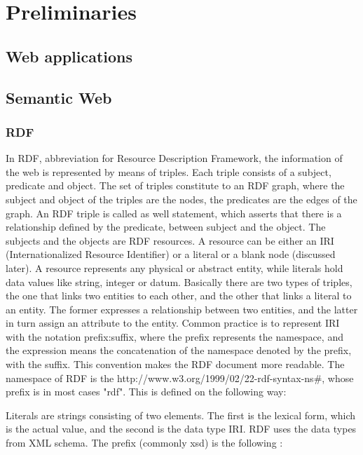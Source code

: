 \chapter{Preliminaries}

\section{Web applications}

\section{Semantic Web}

\subsection{RDF}

In RDF, abbreviation for Resource Description Framework, the information of the web is represented by means of triples. Each triple consists of a subject, predicate and object. The set of triples constitute to an RDF graph, where the subject and object of the triples are the nodes, the predicates are the edges of the graph.
An RDF triple is called as well statement, which asserts that there is a relationship defined by the predicate, between subject and the object. The subjects and the objects are RDF resources. A resource can be either an IRI (Internationalized Resource Identifier) or a literal or a blank node (discussed later). A resource represents any physical or abstract entity, while literals hold data values like string, integer or datum. 
Basically there are two types of triples, the one that links two entities to each other, and the other that links a literal to an entity. The former expresses a relationship between two entities, and the latter in turn assign an attribute to the entity.
Common practice is to represent IRI with the notation prefix:suffix, where the prefix represents the namespace, and the expression means the concatenation of the namespace denoted by the prefix, with the suffix. This convention makes the RDF document more readable. The namespace of RDF is the http://www.w3.org/1999/02/22-rdf-syntax-ns\#, whose prefix is in most cases "rdf".   This is defined on the following way:



Literals are strings consisting of two elements. The first is the lexical form, which is the actual value, and the second is the data type IRI.  RDF uses the data types from XML schema. The prefix (commonly xsd) is the following :

